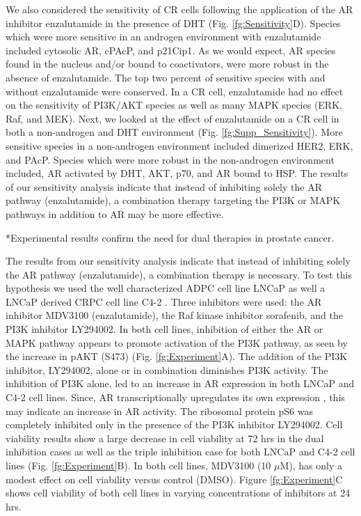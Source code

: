 \documentclass[12pt]{article}
\makeatletter
\renewcommand\subsection{\@startsection
	{subsection}{2}{0mm}
	{-0.05in}
	{-0.5\baselineskip}
	{\normalfont\normalsize\bfseries}}
\makeatother
\begin{document}
We also considered the sensitivity of CR cells following the application of the AR inhibitor enzalutamide in the presence of DHT (Fig. \ref{fg:Sensitivity}D). 
Species which were more sensitive in an androgen environment with enzalutamide included cytosolic AR, cPAcP, and p21Cip1. 
As we would expect, AR species found in the nucleus and/or bound to coactivators, were more robust in the absence of enzalutamide. 
The top two percent of sensitive species with and without enzalutamide were conserved. 
In a CR cell, enzalutamide had no effect on the sensitivity of PI3K/AKT species as well as many MAPK species (ERK, Raf, and MEK). 
Next, we looked at the effect of enzalutamide on a CR cell in both a non-androgen and DHT environment (Fig. \ref{fg:Supp_Sensitivity}). 
More sensitive species in a non-androgen environment included dimerized HER2, ERK, and PAcP. 
Species which were more robust in the non-androgen environment included, AR activated by DHT, AKT, p70, and AR bound to HSP.
The results of our sensitivity analysis indicate that instead of inhibiting solely the AR pathway (enzalutamide), a combination therapy targeting the PI3K or MAPK pathways in addition to AR may be more effective.

\subsection*{Experimental results confirm the need for dual therapies in prostate cancer.} 

The results from our sensitivity analysis indicate that instead of inhibiting solely the AR pathway (enzalutamide), a combination therapy is necessary. 
To test this hypothesis we used the well characterized ADPC cell line LNCaP as well a LNCaP derived CRPC cell line C4-2 \cite{Thalmann1994}. 
Three inhibitors were used: the AR inhibitor MDV3100 (enzalutamide), the Raf kinase inhibitor sorafenib, and the PI3K inhibitor LY294002. 
In both cell lines, inhibition of either the AR or MAPK pathway appears to promote activation of the PI3K pathway, as seen by the increase in pAKT (S473) (Fig. \ref{fg:Experiment}A). 
The addition of the PI3K inhibitor, LY294002, alone or in combination diminishes PI3K activity. 
The inhibition of PI3K alone, led to an increase in AR expression in both LNCaP and C4-2 cell lines. 
Since, AR transcriptionally upregulates its own expression \cite{Lin2003}\cite{Grad1999}, this may indicate an increase in AR activity. 
The ribosomal protein pS6 was completely inhibited only in the presence of the PI3K inhibitor LY294002. 
Cell viability results show a large decrease in cell viability at 72 hrs in the dual inhibition cases as well as the triple inhibition case for both LNCaP and C4-2 cell lines (Fig. \ref{fg:Experiment}B). 
In both cell lines, MDV3100 (10 $\mu$M), has only a modest effect on cell viability versus control (DMSO). 
Figure \ref{fg:Experiment}C shows cell viability of both cell lines in varying concentrations of inhibitors at 24 hrs. 
  
\end{document}
